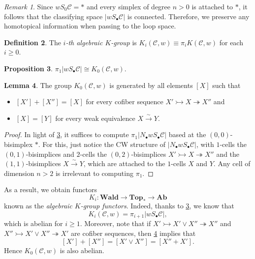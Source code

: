 \documentclass[10pt,letterpaper,cm]{nupset}
\theoremstyle{definition}
\newtheorem{definition}{Definition}
\theoremstyle{theorem}
\newtheorem{lemma}[definition]{Lemma}
\newtheorem{prop}[definition]{Proposition}
\theoremstyle{remark}
\newtheorem{remark}[definition]{Remark}
\newcommand{\1}{\mathbf{1}}
\renewcommand{\c}{\mathscr{C}}
\newcommand{\0}{\vec 0}
\begin{document}
\begin{remark}
Since $wS_0 \c = \ast$ and every simplex of degree $n >0$ is attached to $\ast$, it follows that the classifying space $\left\lvert{w S_{\bullet} \c}\right\rvert$ is connected. Therefore, we preserve any homotopical information when passing to the loop space.
\end{remark}

\begin{definition}
The \textit{$i$-th algebraic $K$-group} is $K_i(\c, w) \equiv \pi_iK(\c, w)$ for each $i\geq 0$. 
\end{definition}

\begin{prop}\label{P4}
$\pi_1\left\lvert{w S_{\bullet} \c}\right\rvert \cong K_0(\c, w)$.
\end{prop}

\begin{lemma}\label{L8}
The group $K_0(\c, w)$ is generated by all elements $\left[X\right]$ such that 
\begin{itemize}
\item $\left[X'\right] + \left[X''\right] = \left[X\right]$ for every cofiber sequence $X' \rightarrowtail X \twoheadrightarrow X''$ and
\item  $\left[X\right] = \left[Y\right]$ for every weak equivalence $X \overset{\sim}{\longrightarrow} Y$.
\end{itemize}
\end{lemma}
\begin{proof}
In light of \cref{P4}, it suffices to compute $\pi_1\left\lvert{N_{\bullet}w S_{\bullet} \c}\right\rvert$ based at the $(0,0)$-bisimplex $\ast$. For this, just notice the CW structure of $\left\lvert{N_{\bullet}w S_{\bullet} \c}\right\rvert$,  with $1$-cells the $(0,1)$-bisimplices and $2$-cells the $(0,2)$-bisimplices $X' \rightarrowtail X \twoheadrightarrow X''$ and the $(1,1)$-bisimplices $X \overset{\sim}{\longrightarrow} Y$, which are attached to the $1$-cells $X$ and $Y$. Any cell of dimension $n>2$ is irrelevant to computing $\pi_1$.
\end{proof}


As a result, we obtain functors $$K_i : \mathbf{Wald} \to \mathbf{Top_{\ast}} \to \mathbf{Ab}$$ known as the \textit{algebraic $K$-group functors}. Indeed, thanks to \cref{P4}, we know that $$K_i(\c, w) = \pi_{i+1}\left\lvert{w S_{\bullet} \c}\right\rvert,$$ which is abelian for $i\geq 1$. Moreover, note that if $X' \rightarrowtail X' \vee X'' \twoheadrightarrow X''$ and $X'' \rightarrowtail X' \vee X'' \twoheadrightarrow X'$ are cofiber sequences, then \cref{L8} implies that $$\left[X'\right] + \left[X''\right] = \left[X' \vee X''\right] = \left[X'' + X'\right].$$ Hence $K_0(\c, w)$ is also abelian.
\end{document}

